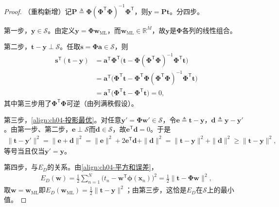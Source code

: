 \documentclass[../../main.tex]{subfiles}
\begin{document}
\begin{proof}
（重构新增）记$\boldsymbol{P}\triangleq\boldsymbol{\Phi}(\boldsymbol{\Phi}^{\mathsf{T}}\boldsymbol{\Phi})^{-1}\boldsymbol{\Phi}^{\mathsf{T}}$，则$\boldsymbol{y}=\boldsymbol{P}\boldsymbol{t}$。分四步。

第一步，$\boldsymbol{y}\in\mathcal{S}$。由定义$\boldsymbol{y}=\boldsymbol{\Phi}\boldsymbol{w}_{\mathrm{ML}}$，而$\boldsymbol{w}_{\mathrm{ML}}\in\mathbb{R}^{M}$，故$\boldsymbol{y}$是$\boldsymbol{\Phi}$各列的线性组合。

第二步，$\boldsymbol{t}-\boldsymbol{y}\perp\mathcal{S}$。任取$\boldsymbol{s}=\boldsymbol{\Phi}\boldsymbol{a}\in\mathcal{S}$，则
\begin{align*}
  \boldsymbol{s}^{\mathsf{T}}(\boldsymbol{t}-\boldsymbol{y})
  &=\boldsymbol{a}^{\mathsf{T}}\boldsymbol{\Phi}^{\mathsf{T}}\bigl(\boldsymbol{t}-\boldsymbol{\Phi}(\boldsymbol{\Phi}^{\mathsf{T}}\boldsymbol{\Phi})^{-1}\boldsymbol{\Phi}^{\mathsf{T}}\boldsymbol{t}\bigr)\\
  &=\boldsymbol{a}^{\mathsf{T}}\bigl(\boldsymbol{\Phi}^{\mathsf{T}}\boldsymbol{t}-\boldsymbol{\Phi}^{\mathsf{T}}\boldsymbol{\Phi}(\boldsymbol{\Phi}^{\mathsf{T}}\boldsymbol{\Phi})^{-1}\boldsymbol{\Phi}^{\mathsf{T}}\boldsymbol{t}\bigr)\\
  &=\boldsymbol{a}^{\mathsf{T}}\bigl(\boldsymbol{\Phi}^{\mathsf{T}}\boldsymbol{t}-\boldsymbol{\Phi}^{\mathsf{T}}\boldsymbol{t}\bigr)=0,
\end{align*}
其中第三步用了$\boldsymbol{\Phi}^{\mathsf{T}}\boldsymbol{\Phi}$可逆（由列满秩假设）。

第三步，\eqref{align:ch04-投影最优}。对任意$\boldsymbol{y}'=\boldsymbol{\Phi}\boldsymbol{w}'\in\mathcal{S}$，令$\boldsymbol{e}\triangleq\boldsymbol{t}-\boldsymbol{y}$，$\boldsymbol{d}\triangleq\boldsymbol{y}-\boldsymbol{y}'$。由第一步、第二步，$\boldsymbol{e}\perp\mathcal{S}$而$\boldsymbol{d}\in\mathcal{S}$，故$\boldsymbol{e}^{\mathsf{T}}\boldsymbol{d}=0$。于是
\begin{align*}
  \|\boldsymbol{t}-\boldsymbol{y}'\|^2=\|\boldsymbol{e}+\boldsymbol{d}\|^2
  =\|\boldsymbol{e}\|^2+2\boldsymbol{e}^{\mathsf{T}}\boldsymbol{d}+\|\boldsymbol{d}\|^2
  =\|\boldsymbol{t}-\boldsymbol{y}\|^2+\|\boldsymbol{d}\|^2\geqslant\|\boldsymbol{t}-\boldsymbol{y}\|^2,
\end{align*}
等号当且仅当$\boldsymbol{y}'=\boldsymbol{y}$。

第四步，与$E_D$的关系。由\eqref{align:ch04-平方和误差}，
\begin{align*}
  E_D(\boldsymbol{w})=\frac{1}{2}\sum_{n=1}^{N}\bigl(t_n-\boldsymbol{w}^{\mathsf{T}}\boldsymbol{\phi}(\boldsymbol{x}_n)\bigr)^2
  =\frac{1}{2}\|\boldsymbol{t}-\boldsymbol{\Phi}\boldsymbol{w}\|^2,
\end{align*}
取$\boldsymbol{w}=\boldsymbol{w}_{\mathrm{ML}}$即$E_D(\boldsymbol{w}_{\mathrm{ML}})=\frac{1}{2}\|\boldsymbol{t}-\boldsymbol{y}\|^2$；由第三步，这恰是$E_D$在$\mathcal{S}$上的最小值。
\end{proof}
\end{document}
